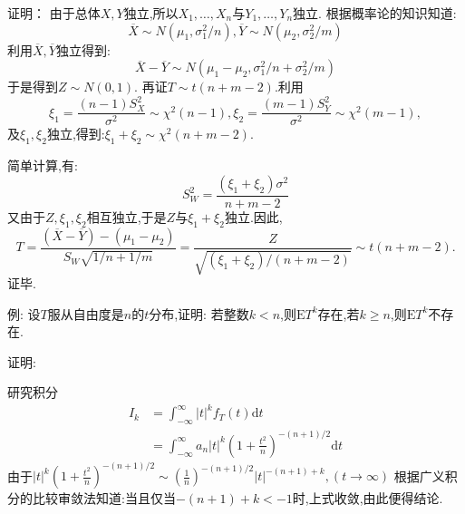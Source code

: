 	\begin{frame}
		证明：	由于总体$X,Y$独立,所以$X_1,\dots,X_n$与$Y_1,\dots,Y_n$独立.
		根据概率论的知识知道:
		\begin{equation}
			\overline{X}\sim N(\mu_1,\sigma_1^2/n),\overline{Y}\sim N(\mu_2,\sigma_2^2/m)
		\end{equation}
		利用$\overline{X},\overline{Y}$独立得到:
		\begin{equation}
			\overline{X}-\overline{Y} \sim N(\mu_1-\mu_2,\sigma_1^2/n+\sigma_2^2/m)
		\end{equation}
		于是得到$Z\sim N(0,1)$.
		再证$T\sim t(n+m-2)$.利用
		\begin{equation}
			\xi_1 = \frac{(n-1)S_X^2}{\sigma^2}\sim \chi^2(n-1),\xi_2 = \frac{(m-1)S_Y^2}{\sigma^2}\sim \chi^2(m-1),
		\end{equation}
		及$\xi_1,\xi_2$独立,得到:$\xi_1+\xi_2 \sim\chi^2(n+m-2)$.
	\end{frame}

	\begin{frame}
		简单计算,有:
		\begin{equation}
			S_W^2 = \frac{(\xi_1+\xi_2)\sigma^2}{n+m-2}
		\end{equation}
		又由于$Z,\xi_1,\xi_2$相互独立,于是$Z$与$\xi_1+\xi_2$独立.因此,
		\begin{equation}
			T=\frac{(\overline{X}-\overline{Y})-(\mu_1-\mu_2)}{S_W\sqrt{1/n+1/m}} = \frac{Z}{\sqrt{(\xi_1+\xi_2)/(n+m-2)}}\sim t(n+m-2).
		\end{equation}
		证毕.
	\end{frame}

	\begin{frame}
		例: 设$T$服从自由度是$n$的$t$分布,证明:
		若整数$k<n$,则$\mathrm{E}T^k$存在,若$k\geqslant n$,则$\mathrm{E}T^k$不存在.
		
		证明:
		
		研究积分\begin{equation}
			\begin{split}
				I_k &= \int_{-\infty}^{\infty} |t|^kf_T(t)\mathrm{d}t \\
				&= \int_{-\infty}^{\infty} a_n|t|^k\left(1+\frac{t^2}{n}\right)^{-(n+1)/2}\mathrm{d}t
			\end{split}
		\end{equation}
		由于$|t|^k\left(1+\frac{t^2}{n}\right)^{-(n+1)/2}\sim (\frac{1}{n})^{-(n+1)/2}|t|^{-(n+1)+k},(t\rightarrow\infty)$
		根据广义积分的比较审敛法知道:当且仅当$-(n+1)+k<-1$时,上式收敛,由此便得结论.
	\end{frame}

